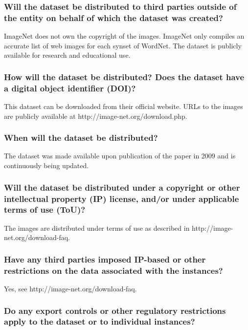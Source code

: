 \documentclass[a4paper,12pt]{article}
\begin{document}
\subsubsection*{Will the dataset be distributed to third parties outside of the entity on behalf of which the dataset was created?}

ImageNet does not own the copyright of the images. ImageNet only compiles an accurate list of web
images for each synset of WordNet. The dataset is publicly available for research and educational
use.

\subsubsection*{How will the dataset be distributed? Does the dataset have a
  digital object identifier (DOI)?}

This dataset can be downloaded from their official website. URLs to the images are publicly available
at http://image-net.org/download.php.

\subsubsection*{When will the dataset be distributed?}

The dataset was made available upon publication of the paper in 2009 and is continuously being
updated.
\subsubsection*{Will the dataset be distributed under a copyright or other intellectual property (IP) license, and/or
  under applicable terms of use (ToU)?}

The images are distributed under terms of use as described in http://image-net.org/download-faq.

\subsubsection*{Have any third parties imposed IP-based or other restrictions on the data associated with the
  instances?}

Yes, see http://image-net.org/download-faq.

\subsubsection*{Do any export controls or other regulatory restrictions apply to the dataset or to individual
  instances?}
\end{document}
